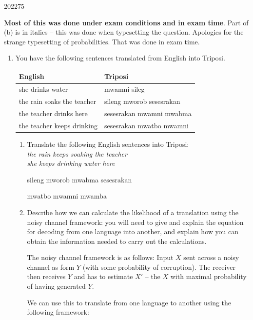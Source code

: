 \documentclass[10pt,\jkfside,a4paper]{article}
\begin{document}
\begin{examquestion}{2022}{7}{5}

\textbf{Most of this was done under exam conditions and in exam time}.
Part of (b) is in italics -- this was done when typesetting the question.
Apologies for the strange typesetting of probabilities. That was done in
exam time.

\begin{enumerate}

\item You have the following sentences translated from English into Triposi.

\begin{table}[H]
\centering
\begin{tabular}{l|l}
English & Triposi \\
\hline
she drinks water
&
mwamni sileg \\
the rain soaks the teacher
&
sileng mworob sesesrakan \\
the teacher drinks here
&
sesesrakan mwamni mwabma \\
the teacher keeps drinking
&
sesesrakan mwatbo mwamni
\end{tabular}
\end{table}

\begin{enumerate}

\item Translate the following English sentences into Triposi:\\
\textit{the rain keeps soaking the teacher}\\
\textit{she keeps drinking water here}

sileng mworob mwabma sesesrakan

mwatbo mwamni mwamba

\item Describe how we can calculate the likelihood of a translation using
the noisy channel framework: you will need to give and explain the equation
for decoding from one language into another, and explain how you can obtain
the information needed to carry out the calculations.

The noisy channel framework is as follows:
Input $X$ sent across a noisy channel as form $Y$ (with some probability of
corruption). The receiver then receives $Y$ and has to estimate $X'$ --
the $X$ with maximal probability of having generated $Y$.

We can use this to translate from one language to another using the
following framework:


\end{enumerate}
\end{enumerate}
\end{examquestion}
\end{document}
